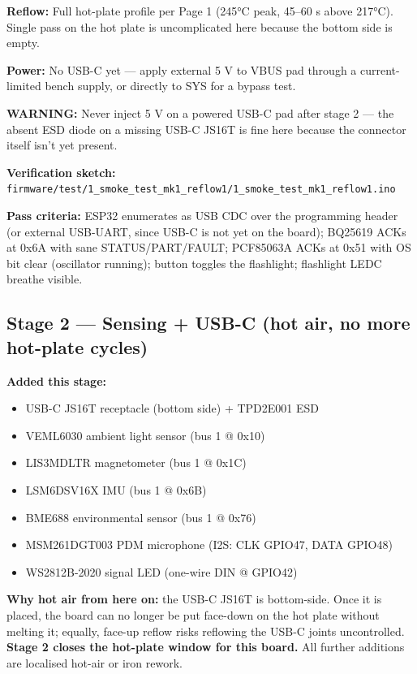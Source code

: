 \documentclass[11pt,a4paper]{article}
\newcommand{\dangerbox}[1]{\par\noindent\colorbox{danger!10}{\parbox{\dimexpr\textwidth-2\fboxsep}{%
\textcolor{danger}{\textbf{WARNING:}} #1}}\par\vspace{0.5em}}
\begin{document}
\textbf{Reflow:} Full hot-plate profile per Page 1 (245°C peak, 45--60 s above 217°C). Single pass on the hot plate is uncomplicated here because the bottom side is empty.

\textbf{Power:} No USB-C yet — apply external 5 V to VBUS pad through a current-limited bench supply, or directly to SYS for a bypass test. \dangerbox{Never inject 5 V on a powered USB-C pad after stage 2 — the absent ESD diode on a missing USB-C JS16T is fine here because the connector itself isn't yet present.}

\textbf{Verification sketch:} \texttt{firmware/test/1\_smoke\_test\_mk1\_reflow1/1\_smoke\_test\_mk1\_reflow1.ino}

\textbf{Pass criteria:} ESP32 enumerates as USB CDC over the programming header (or external USB-UART, since USB-C is not yet on the board); BQ25619 ACKs at 0x6A with sane STATUS/PART/FAULT; PCF85063A ACKs at 0x51 with OS bit clear (oscillator running); button toggles the flashlight; flashlight LEDC breathe visible.

\subsection*{Stage 2 — Sensing + USB-C (hot air, no more hot-plate cycles)}

\textbf{Added this stage:}
\begin{itemize}[nosep]
\item USB-C JS16T receptacle (bottom side) + TPD2E001 ESD
\item VEML6030 ambient light sensor (bus 1 @ 0x10)
\item LIS3MDLTR magnetometer (bus 1 @ 0x1C)
\item LSM6DSV16X IMU (bus 1 @ 0x6B)
\item BME688 environmental sensor (bus 1 @ 0x76)
\item MSM261DGT003 PDM microphone (I2S: CLK GPIO47, DATA GPIO48)
\item WS2812B-2020 signal LED (one-wire DIN @ GPIO42)
\end{itemize}

\textbf{Why hot air from here on:} the USB-C JS16T is bottom-side. Once it is placed, the board can no longer be put face-down on the hot plate without melting it; equally, face-up reflow risks reflowing the USB-C joints uncontrolled. \textbf{Stage 2 closes the hot-plate window for this board.} All further additions are localised hot-air or iron rework.
\end{document}
